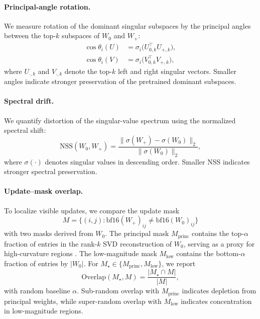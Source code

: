 \paragraph{Principal-angle rotation.}
We measure rotation of the dominant singular subspaces by the principal angles 
between the top-$k$ subspaces of $W_0$ and $W_+$:
\vspace{-0.3em}
\begin{equation}
\begin{split}
  \cos\theta_i(U) &= \sigma_i\!\bigl(U_{0,k}^\top U_{+,k}\bigr), \\
  \cos\theta_i(V) &= \sigma_i\!\bigl(V_{0,k}^\top V_{+,k}\bigr),
\end{split}
\end{equation}
where $U_{\cdot,k}$ and $V_{\cdot,k}$ denote the top-$k$ left and right 
singular vectors. Smaller angles indicate stronger preservation of the 
pretrained dominant subspaces.

\paragraph{Spectral drift.}
We quantify distortion of the singular-value spectrum using the normalized 
spectral shift:
\begin{equation}
 \mathrm{NSS}(W_0,W_+) = \frac{\|\sigma(W_+) - \sigma(W_0)\|_2}
                         {\|\sigma(W_0)\|_2},
\end{equation}
where $\sigma(\cdot)$ denotes singular values in descending order. Smaller NSS 
indicates stronger spectral preservation.

\paragraph{Update--mask overlap.}
To localize visible updates, we compare the update mask
\[
M = \{(i,j): \text{bf16}(W_+)_{ij} \neq \text{bf16}(W_0)_{ij}\}
\]
with two masks derived from $W_0$. The principal mask $M_{\mathrm{princ}}$ 
contains the top-$\alpha$ fraction of entries in the rank-$k$ SVD 
reconstruction of $W_0$, serving as a proxy for high-curvature regions 
\cite{liu2026liftveiltruthprincipal}. The low-magnitude mask $M_{\mathrm{low}}$ contains 
the bottom-$\alpha$ fraction of entries by $|W_0|$. For $M_\star \in \{M_{\mathrm{princ}}, M_{\mathrm{low}}\}$, we report
\vspace{-0.3em}
\[
\mathrm{Overlap}(M_\star,M) = \frac{|M_\star \cap M|}{|M|},
\]
with random baseline $\alpha$. Sub-random overlap with $M_{\mathrm{princ}}$ 
indicates depletion from principal weights, while super-random overlap with 
$M_{\mathrm{low}}$ indicates concentration in low-magnitude regions.







